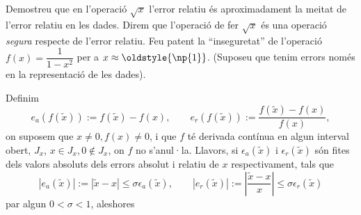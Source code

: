 \documentclass[a4paper,twoside,12pt]{exam}
\newcommand{\osnp}[1]{\oldstyle{\np{#1}}}
\begin{document}
\begin{questions}
\question\label{prob:5}
Demostreu que en l'operació $\sqrt{x}$ l'error relatiu és aproximadament la
meitat de l'error relatiu en les dades. Direm que l'operació de fer $\sqrt{x}$
és una operació \emph{segura} respecte de l'error relatiu. Feu patent la
``inseguretat'' de l'operació $f(x) = \dfrac{1}{1-x^{2}}$ per a $x\approx\osnp{1}$.
(Suposeu que tenim errors només en la representació de les dades). 
\begin{solution}
%  
%
Definim
\begin{displaymath}
 e_{a}\left(f\left(\tilde{x}\right)\right) := f\left(\tilde{x}\right) -
 f\left(x\right),\qquad
  e_{r}\left(f\left(\tilde{x}\right)\right) := \frac{f\left(\tilde{x}\right) -
  f\left(x\right)}{f\left(x\right)},
\end{displaymath}
on suposem que $x \ne 0, f(x)\ne 0$, i que $f$ té derivada contínua en algun interval
obert, $J_{x}$, $x\in J_{x}, 0\notin J_{x}$, on $f$ no s'anul·la. 
Llavors, si $\epsilon_{a}\left(\tilde{x}\right)$ i
$\epsilon_{r}\left(\tilde{x}\right)$ són fites dels valors absoluts dels
errors absolut i relatiu de $x$ respectivament, tals que 
\begin{equation}\label{eq:sigma-eaar}
  \left|e_{a}\left(\tilde{x}\right)\right| := \left|\tilde{x} - x\right|
  \le \sigma\epsilon_{a}\left(\tilde{x}\right),\qquad
  \left|e_{r}\left(\tilde{x}\right)\right| := \left|\frac{\tilde{x} - x}{x}\right|
  \le \sigma\epsilon_{r}\left(\tilde{x}\right)
\end{equation}
par algun $0 < \sigma < 1$, aleshores 
\end{solution}
\end{questions}
\end{document}
